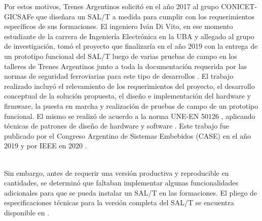 Por estos motivos, Trenes Argentinos solicitó en el año 2017 al grupo CONICET-GICSAFe que diseñara un SAL/T a medida para cumplir con los requerimientos específicos de sus formaciones. El ingeniero Iván Di Vito, en ese momento estudiante de la carrera de Ingeniería Electrónica en la UBA y allegado al grupo de investigación, tomó el proyecto que finalizaría en el año 2019 con la entrega de un prototipo funcional del SAL/T luego de varias pruebas de campo en los talleres de Trenes Argentinos junto a toda la documentación requerida por las normas de seguridad ferroviarias para este tipo de desarrollos \cite{salt_ivan}. El trabajo realizado incluyó el relevamiento de los requerimientos del proyecto, el desarrollo conceptual de la solución propuesta, el diseño e implementación del hardware y firmware, la puesta en marcha y realización de pruebas de campo de un prototipo funcional. El mismo se realizó de acuerdo a la norma UNE-EN 50126 \cite{norma_50126}, aplicando técnicas de patrones de diseño de hardware y software \cite{patrones}. Este trabajo fue publicado por el Congreso Argentino de Sistemas Embebidos (CASE) en el año 2019 \cite{salt_case} y por IEEE en  2020 \cite{salt_paper}. \\\



Sin embargo, antes de requerir una versión productiva y reproducible en cantidades, se determinó que faltaban implementar algunas funcionalidades adicionales para que se pueda instalar un SAL/T en las formaciones. El pliego de especificaciones técnicas para la versión completa del SAL/T se encuentra disponible en \cite{spec}. \\
